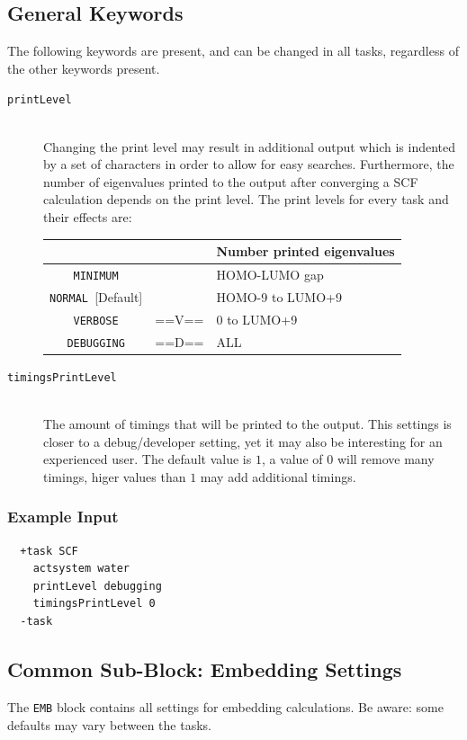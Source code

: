 \documentclass[bibliography=totocnumbered,a4paper,10pt,oneside]{scrbook}
\begin{document}
\subsection{General Keywords}
\label{sec:tasksPrintLevels}
The following keywords are present, and can be changed in all tasks, regardless
of the other keywords present.
\begin{description}
  \item [\texttt{printLevel}]\hfill \\
Changing the print level may result in additional output which is indented by
a set of characters in order to allow for easy searches. Furthermore, the number
of eigenvalues printed to the output after converging a SCF calculation depends
on the print level.
The print levels for every task and their effects are:
\begin{table}[H]\small \centering \begin{tabular}{|>{\ttfamily}c|>{\ttfamily}c|l|}\hline
   & \multicolumn{1}{c|}{Indent}&\multicolumn{1}{c|}{Number printed eigenvalues}\\\hline
  \texttt{MINIMUM}          &       & HOMO-LUMO gap    \\\hline
  \texttt{NORMAL }[Default] &       & HOMO-9 to LUMO+9 \\\hline
  \texttt{VERBOSE}          & ==V== & 0 to LUMO+9      \\\hline
  \texttt{DEBUGGING}        & ==D== & ALL              \\\hline
\end{tabular}
\end{table}
\item [\texttt{timingsPrintLevel}]\hfill \\
   The amount of timings that will be printed to the output. This settings is closer to a
   debug/developer setting, yet it may also be interesting for an experienced user.
   The default value is $1$, a value of $0$ will remove many timings, higer
   values than $1$ may add additional timings.
\end{description}
\subsubsection{Example Input}
\begin{lstlisting}
  +task SCF
    actsystem water
    printLevel debugging
    timingsPrintLevel 0
  -task
\end{lstlisting}


\subsection{Common Sub-Block: Embedding Settings}
\label{sec:scb:emb}
The \texttt{EMB} block contains all settings for embedding calculations. Be aware: some defaults may vary between the tasks.
\end{document}
